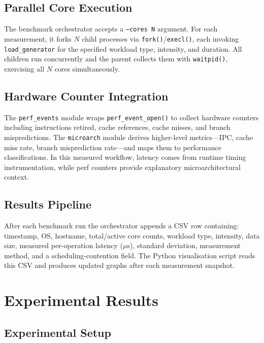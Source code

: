 \documentclass[conference]{IEEEtran}
\begin{document}
\subsection{Parallel Core Execution}

The benchmark orchestrator accepts a \texttt{--cores N} argument.  For each
measurement, it forks $N$ child processes via \texttt{fork()}/\texttt{execl()},
each invoking \texttt{load\_generator} for the specified workload type,
intensity, and duration.  All children run concurrently and the parent
collects them with \texttt{waitpid()}, exercising all $N$ cores
simultaneously.

\subsection{Hardware Counter Integration}

The \texttt{perf\_events} module wraps \texttt{perf\_event\_open()} to collect
hardware counters including instructions retired, cache references, cache
misses, and branch mispredictions.  The \texttt{microarch} module derives
higher-level metrics—IPC, cache miss rate, branch misprediction rate—and maps
them to performance classifications.  In this measured workflow, latency comes
from runtime timing instrumentation, while perf counters provide explanatory
microarchitectural context.

\subsection{Results Pipeline}

After each benchmark run the orchestrator appends a CSV row containing:
timestamp, OS, hostname, total/active core counts, workload type, intensity,
data size, measured per-operation latency ($\mu$s), standard deviation,
measurement method, and a scheduling-contention field.  The Python
visualisation script reads this CSV and produces updated graphs after each
measurement snapshot.

\section{Experimental Results}
\label{sec:results}

\subsection{Experimental Setup}
\end{document}
